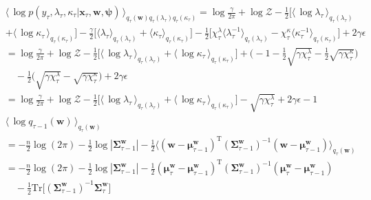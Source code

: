 \begin{align}
	& \langle\,\log p(y_\tau, \lambda_\tau, \kappa_\tau|\mathbf{x}_\tau, \mathbf{w}, \boldsymbol{\psi})\,\rangle_{q_{\tau}(\mathbf{w})q_{\tau}(\lambda_{\tau})q_{\tau}(\kappa_{\tau})}
	= \log\frac{\gamma}{2\pi} + \log\mathcal{Z} - \frac{1}{2}\big[\langle\,\log\lambda_\tau\,\rangle_{q_{\tau}(\lambda_{\tau})} 
	\nonumber \\
	& + \langle\,\log\kappa_\tau\,\rangle_{q_{\tau}(\kappa_{\tau})}\big] - \frac{\gamma}{2}\big[\langle\lambda_\tau\rangle_{q_{\tau}(\lambda_{\tau})} + \langle\kappa_\tau\rangle_{q_{\tau}(\kappa_{\tau})}\big] - \frac{1}{2}\big[\chi_\tau^\lambda\langle\lambda_\tau^{-1}\rangle_{q_{\tau}(\lambda_{\tau})} - \chi_\tau^\kappa\langle\kappa_\tau^{-1}\rangle_{q_{\tau}(\kappa_{\tau})}\big] + 2\gamma\epsilon
	\nonumber \\
	&= \log\frac{\gamma}{2\pi} + \log\mathcal{Z} - \frac{1}{2}\big[\langle\,\log\lambda_\tau\,\rangle_{q_{\tau}(\lambda_{\tau})} + \langle\,\log\kappa_\tau\,\rangle_{q_{\tau}(\kappa_{\tau})}\big] + \big(-1 - \frac{1}{2}\sqrt{\gamma\chi_\tau^\lambda} - \frac{1}{2}\sqrt{\gamma\chi_\tau^\kappa}\big)
	\nonumber \\
	& \quad - \frac{1}{2}\big(\sqrt{\gamma\chi_\tau^\lambda} - \sqrt{\gamma\chi_\tau^\kappa}\big) + 2\gamma\epsilon
	\nonumber \\
	&= \log\frac{\gamma}{2\pi} + \log\mathcal{Z} - \frac{1}{2}\big[\langle\,\log\lambda_\tau\,\rangle_{q_{\tau}(\lambda_{\tau})} + \langle\,\log\kappa_\tau\,\rangle_{q_{\tau}(\kappa_{\tau})}\big] - \sqrt{\gamma\chi_\tau^\lambda} + 2\gamma\epsilon - 1
	\\
	& \langle\,\log q_{\tau-1}(\mathbf{w})\,\rangle_{q_{\tau}(\mathbf{w})}
	\nonumber \\
	&= -\frac{n}{2}\log(2\pi) - \frac{1}{2}\log|\boldsymbol{\Sigma}_{\tau-1}^\mathbf{w}| 
	- \frac{1}{2}\big\langle(\mathbf{w}-\boldsymbol{\mu}_{\tau-1}^\mathbf{w})^\text{T}(\boldsymbol{\Sigma}_{\tau-1}^\mathbf{w})^{-1}(\mathbf{w}-\boldsymbol{\mu}_{\tau-1}^\mathbf{w})\big\rangle_{q_{\tau}(\mathbf{w})}
	\nonumber \\
	&= -\frac{n}{2}\log(2\pi) - \frac{1}{2}\log|\boldsymbol{\Sigma}_{\tau-1}^\mathbf{w}| 
	- \frac{1}{2}(\boldsymbol{\mu}_{\tau}^\mathbf{w}-\boldsymbol{\mu}_{\tau-1}^\mathbf{w})^\text{T}(\boldsymbol{\Sigma}_{\tau-1}^\mathbf{w})^{-1}(\boldsymbol{\mu}_{\tau}^\mathbf{w}-\boldsymbol{\mu}_{\tau-1}^\mathbf{w})
	\nonumber \\	
	& \quad -\frac{1}{2}\mathrm{Tr}\big[(\boldsymbol{\Sigma}_{\tau-1}^\mathbf{w})^{-1}\boldsymbol{\Sigma}_{\tau}^\mathbf{w}\big]

\end{align}
